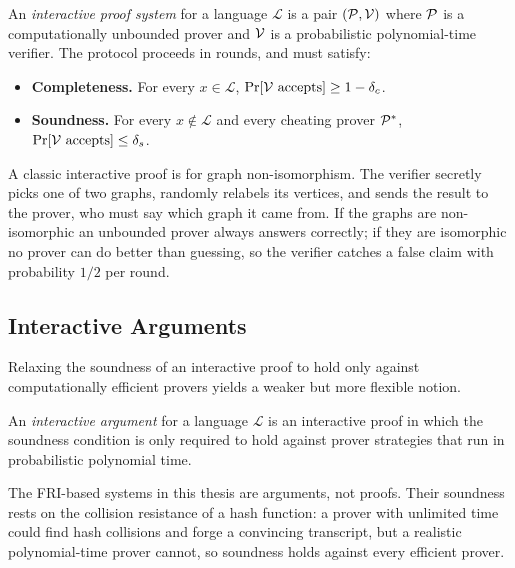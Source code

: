 \begin{definition}
\label{def:interactive_proof}
An \emph{interactive proof system} for a language $\mathcal{L}$ is a
pair $(\mathcal{P}, \mathcal{V})$ where $\mathcal{P}$ is a computationally
unbounded prover and $\mathcal{V}$ is a probabilistic polynomial-time
verifier. The protocol proceeds in rounds, and must satisfy:
\begin{itemize}
  \item \textbf{Completeness.} For every $x \in \mathcal{L}$,
    $\Pr[\mathcal{V} \text{ accepts}] \geq 1 - \delta_c$.
  \item \textbf{Soundness.} For every $x \notin \mathcal{L}$ and every
    cheating prover $\mathcal{P}^*$,
    $\Pr[\mathcal{V} \text{ accepts}] \leq \delta_s$.
\end{itemize}
\end{definition}

\begin{example}
\label{ex:interactive_proof}
A classic interactive proof is for graph non-isomorphism. The verifier
secretly picks one of two graphs, randomly relabels its vertices, and
sends the result to the prover, who must say which graph it came from.
If the graphs are non-isomorphic an unbounded prover always answers
correctly; if they are isomorphic no prover can do better than
guessing, so the verifier catches a false claim with probability
$1/2$ per round.
\end{example}


\subsection{Interactive Arguments}
\label{subsec:arguments}

Relaxing the soundness of an interactive proof to hold only against
computationally efficient provers yields a weaker but more flexible
notion.

\begin{definition}
\label{def:argument}
An \emph{interactive argument} for a language $\mathcal{L}$ is an
interactive proof in which the soundness condition is only required to
hold against prover strategies that run in probabilistic polynomial
time.
\end{definition}

\begin{example}
\label{ex:argument}
The FRI-based systems in this thesis are arguments, not proofs. Their
soundness rests on the collision resistance of a hash function: a
prover with unlimited time could find hash collisions and forge a
convincing transcript, but a realistic polynomial-time prover cannot,
so soundness holds against every efficient prover.
\end{example}

